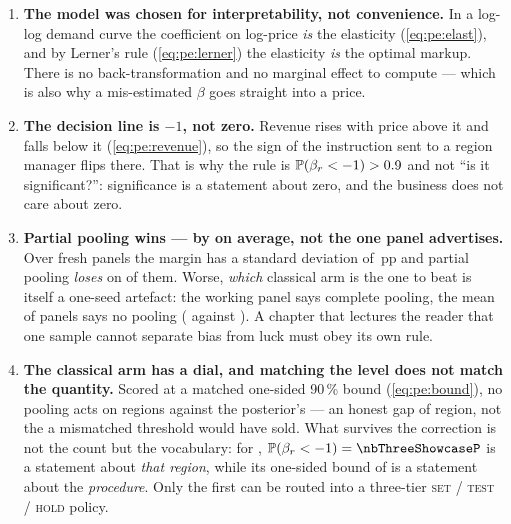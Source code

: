 \begin{enumerate}[leftmargin=*, itemsep=.45em]
  \item \textbf{The model was chosen for interpretability, not convenience.} In a log-log demand
        curve the coefficient on log-price \emph{is} the elasticity (\cref{eq:pe:elast}), and by
        Lerner's rule (\cref{eq:pe:lerner}) the elasticity \emph{is} the optimal markup. There is no
        back-transformation and no marginal effect to compute --- which is also why a mis-estimated
        $\beta$ goes straight into a price.

  \item \textbf{The decision line is $-1$, not zero.} Revenue rises with price above it and falls
        below it (\cref{eq:pe:revenue}), so the sign of the instruction sent to a region manager
        flips there. That is why the rule is $\operatorname{\mathbb{P}}(\beta_r < -1) > 0.9$ and not ``is it
        significant?'': significance is a statement about zero, and the business does not care about
        zero.

  \item \textbf{Partial pooling wins --- by \pc{\nbThreeGainMean} on average, not the
        \pc{\nbThreeGainOne} one panel advertises.} Over \nbThreeNseed{} fresh panels the margin has
        a standard deviation of \nbThreeGainSd\,pp and partial pooling \emph{loses} on
        \nbThreeNLosses{} of them. Worse, \emph{which} classical arm is the one to beat is itself a
        one-seed artefact: the working panel says complete pooling, the mean of \nbThreeNseed{}
        panels says no pooling (\nbThreeMaeNopool{} against \nbThreeMaeComplete). A chapter that
        lectures the reader that one sample cannot separate bias from luck must obey its own rule.

  \item \textbf{The classical arm has a dial, and matching the level does not match the quantity.}
        Scored at a matched one-sided 90\,\% bound (\cref{eq:pe:bound}), no pooling acts on
        \nbThreeActNp{} regions against the posterior's \nbThreeActPp{} --- an honest gap of
        \nbThreeGapHonest{} region, not the \nbThreeGapMismatched{} a mismatched threshold would
        have sold. What survives the correction is not the count but the vocabulary: for
        \nbThreeShowcaseRegion, $\Prob(\beta_r < -1) = \nbThreeShowcaseP$ is a statement about
        \emph{that region}, while its one-sided bound of \nbThreeShowcaseBound{} is a statement about
        the \emph{procedure}. Only the first can be routed into a three-tier \textsc{set} /
        \textsc{test} / \textsc{hold} policy.


\end{enumerate}
